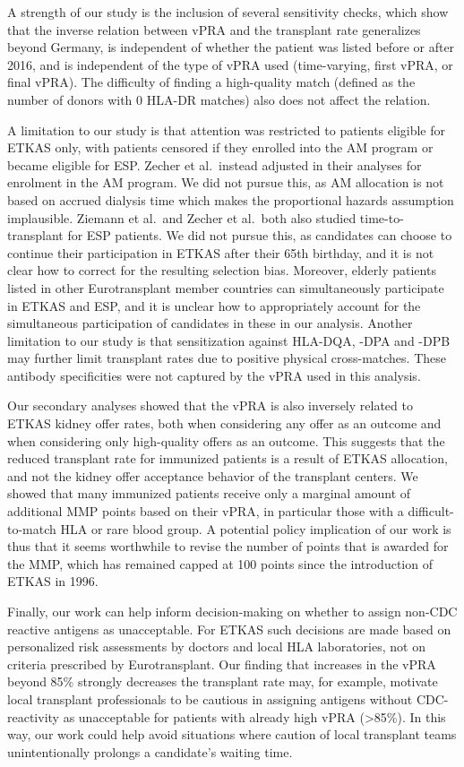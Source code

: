\documentclass[11pt,twoside,]{book}
\begin{document}
A strength of our study is the inclusion of several sensitivity checks, which show that the inverse
relation between vPRA and the transplant rate generalizes beyond Germany,
is independent of whether the patient was listed before or after 2016, and is
independent of the type of vPRA used (time-varying, first vPRA, or final vPRA).
The difficulty of finding a high-quality match (defined as the number of donors
with 0 HLA-DR matches) also does not affect the relation.

A limitation to our study is that attention was restricted to patients
eligible for ETKAS only, with patients censored if they enrolled into the
AM program or became eligible for ESP. Zecher et al.~instead adjusted in
their analyses for enrolment in the AM program. We did not pursue this, as
AM allocation is not based on accrued dialysis time which makes the proportional
hazards assumption implausible. Ziemann et al.~and Zecher et al.~both also
studied time-to-transplant for ESP patients. We did not pursue this, as candidates can choose to continue their participation in ETKAS after their 65th birthday, and it is not clear how to correct for the resulting selection bias. Moreover, elderly patients listed
in other Eurotransplant member countries can simultaneously participate in ETKAS
and ESP, and it is unclear how to appropriately account for the simultaneous
participation of candidates in these in our analysis. Another limitation to our
study is that sensitization against
HLA-DQA, -DPA and -DPB may further limit transplant rates due to positive
physical cross-matches. These antibody specificities were not captured by
the vPRA used in this analysis.

Our secondary analyses showed that the vPRA is also inversely related to
ETKAS kidney offer rates, both when considering any offer as an outcome
and when considering only high-quality offers as an outcome. This
suggests that the reduced transplant rate for immunized patients is
a result of ETKAS allocation, and not the kidney offer acceptance behavior of
the transplant centers. We showed that many immunized patients receive only a marginal amount of
additional MMP points based on their vPRA, in particular those with a difficult-to-match
HLA or rare blood group. A potential policy implication of our work is thus
that it seems worthwhile to revise the number of points that is awarded for the MMP,
which has remained capped at 100 points since the introduction of ETKAS
in 1996.

Finally, our work can help inform decision-making on whether to assign
non-CDC reactive antigens as unacceptable. For ETKAS such decisions are
made based on personalized risk assessments by doctors and local HLA
laboratories, not on criteria prescribed by Eurotransplant. Our finding
that increases in the vPRA beyond 85\% strongly
decreases the transplant rate may, for example, motivate local
transplant professionals to be cautious in assigning antigens without
CDC-reactivity as unacceptable for patients with already high vPRA
(\textgreater85\%). In this way, our work could help avoid situations where caution
of local transplant teams unintentionally prolongs a candidate's waiting time.
\end{document}
